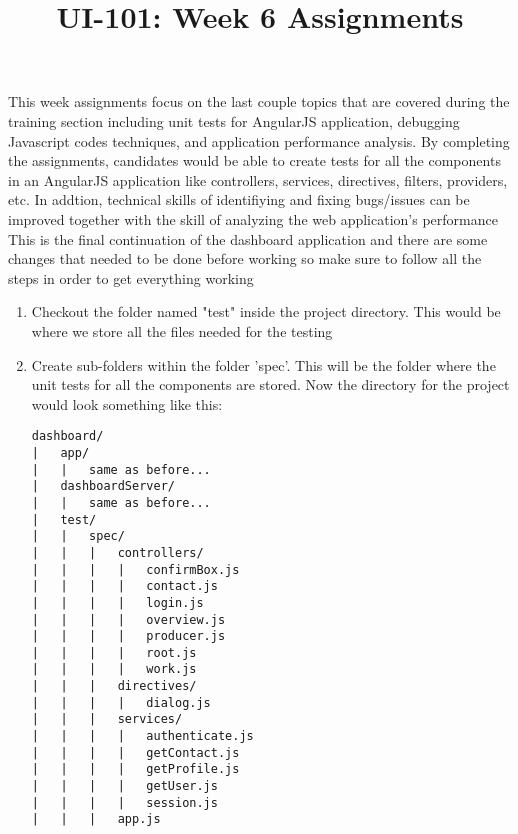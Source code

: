 \documentclass[12pt]{article}
\begin{document}
\title{UI-101: Week 6 Assignments}
\date{}
\author{}
\maketitle

\begin{flushleft}
This week assignments focus on the last couple topics that are covered during the training section including unit tests for AngularJS application, debugging Javascript codes techniques, and application performance analysis. By completing the assignments, candidates would be able to create tests for all the components in an AngularJS application like controllers, services, directives, filters, providers, etc. In addtion, technical skills of identifiying and fixing bugs/issues can be improved together with the skill of analyzing the web application's performance\\
\vspace{5mm}
This is the final continuation of the dashboard application and there are some changes that needed to be done before working so make sure to follow all the steps in order to get everything working
\vspace{5mm}\\
\begin{enumerate}
	\item Checkout the folder named "test" inside the project directory. This would be where we store all the files needed for the testing
	\item Create sub-folders within the folder 'spec'. This will be the folder where the unit tests for all the components are stored. Now the directory for the project would look something like this:
	\begin{verbatim}
dashboard/
|	app/
|	|	same as before...
|	dashboardServer/
|	|	same as before...
|	test/
|	|	spec/
|	|	|	controllers/
|	|	|	|	confirmBox.js
|	|	|	|	contact.js
|	|	|	|	login.js
|	|	|	|	overview.js
|	|	|	|	producer.js
|	|	|	|	root.js
|	|	|	|	work.js
|	|	|	directives/
|	|	|	|	dialog.js
|	|	|	services/
|	|	|	|	authenticate.js
|	|	|	|	getContact.js
|	|	|	|	getProfile.js
|	|	|	|	getUser.js
|	|	|	|	session.js
|	|	|	app.js
	\end{verbatim}	
\end{enumerate}
\end{flushleft}
\end{document}
